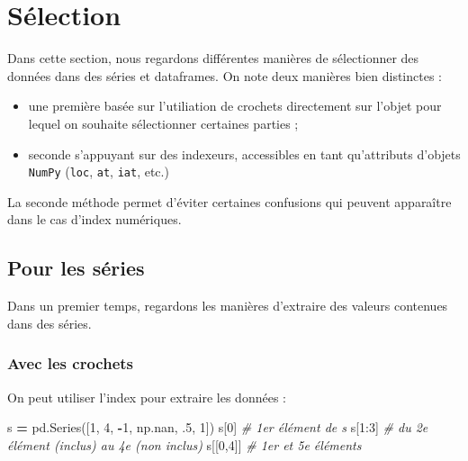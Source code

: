 \documentclass[12pt,]{book}
\newenvironment{Shaded}{\begin{snugshade}}{\end{snugshade}}
\newcommand{\DecValTok}[1]{\textcolor[rgb]{0.00,0.00,0.81}{#1}}
\newcommand{\CommentTok}[1]{\textcolor[rgb]{0.56,0.35,0.01}{\textit{#1}}}
\newcommand{\OperatorTok}[1]{\textcolor[rgb]{0.81,0.36,0.00}{\textbf{#1}}}
\newcommand{\NormalTok}[1]{#1}
\providecommand{\tightlist}{%
  \setlength{\itemsep}{0pt}\setlength{\parskip}{0pt}}
\numberwithin{equation}{section}
\numberwithin{countremarque}{section}
\begin{document}
\section{Sélection}\label{pandas-selection}

Dans cette section, nous regardons différentes manières de sélectionner
des données dans des séries et dataframes. On note deux manières bien
distinctes :

\begin{itemize}
\tightlist
\item
  une première basée sur l'utiliation de crochets directement sur
  l'objet pour lequel on souhaite sélectionner certaines parties ;
\item
  seconde s'appuyant sur des indexeurs, accessibles en tant qu'attributs
  d'objets \texttt{NumPy} (\texttt{loc}, \texttt{at}, \texttt{iat},
  etc.)
\end{itemize}

La seconde méthode permet d'éviter certaines confusions qui peuvent
apparaître dans le cas d'index numériques.

\subsection{Pour les séries}\label{pour-les-series}

Dans un premier temps, regardons les manières d'extraire des valeurs
contenues dans des séries.

\subsubsection{Avec les crochets}\label{avec-les-crochets}

On peut utiliser l'index pour extraire les données :

\begin{Shaded}
\begin{Highlighting}[]
\NormalTok{s }\OperatorTok{=}\NormalTok{ pd.Series([}\DecValTok{1}\NormalTok{, }\DecValTok{4}\NormalTok{, }\OperatorTok{-}\DecValTok{1}\NormalTok{, np.nan, .}\DecValTok{5}\NormalTok{, }\DecValTok{1}\NormalTok{])}
\NormalTok{s[}\DecValTok{0}\NormalTok{] }\CommentTok{# 1er élément de s}
\NormalTok{s[}\DecValTok{1}\NormalTok{:}\DecValTok{3}\NormalTok{] }\CommentTok{# du 2e élément (inclus) au 4e (non inclus)}
\NormalTok{s[[}\DecValTok{0}\NormalTok{,}\DecValTok{4}\NormalTok{]] }\CommentTok{# 1er et 5e éléments}
\end{Highlighting}
\end{Shaded}
\end{document}

